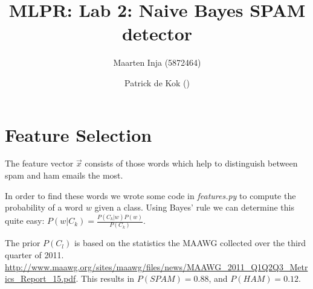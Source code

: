 \documentclass[a4paper,11pt]{article}
\author{Maarten Inja (5872464) \and Patrick de Kok ()}
\title{MLPR: Lab 2: Naive Bayes SPAM detector}
\begin{document}
\maketitle

\section*{Feature Selection}
The feature vector $\vec{x}$ consists of those words which 
help to distinguish between spam and ham emails the most. 

In order to find these words we wrote some code in \textit{features.py} 
to compute the probability of a word $w$ given a class. Using Bayes' rule
we can determine this quite easy: $P(w|C_k) = \frac{P(C_k|w)P(w)}{P(C_k)}$.

The prior $P(C_l)$ is based on the statistics the MAAWG collected over the 
third quarter of 2011.
\url{http://www.maawg.org/sites/maawg/files/news/MAAWG_2011_Q1Q2Q3_Metrics_Report_15.pdf}. This results in $P(SPAM) = 0.88$, and $P(HAM) = 0.12$.
\end{document}
